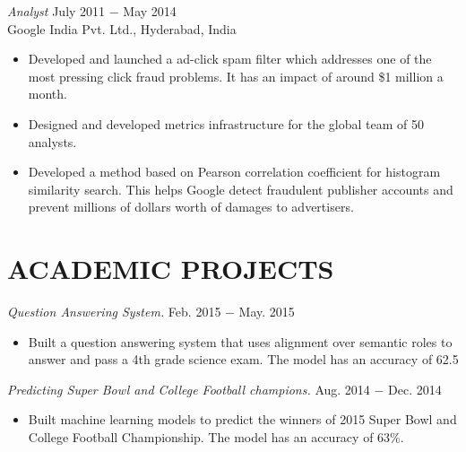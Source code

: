 \documentclass[margin, 2pt]{res} %
\begin{document}
\begin{resume}
{\sl Analyst} \hfill July 2011 $-$ May 2014 \\
Google India Pvt. Ltd., Hyderabad, India 

\begin{itemize} \itemsep -2pt %
  \item Developed and launched a ad-click spam filter which addresses one of the most pressing click fraud problems.
  		It  has an impact of around \$1 million a month.
  \item Designed and developed metrics infrastructure for the global team of 50 analysts.
  \item Developed a method based on Pearson correlation coefficient for histogram similarity search.
  		This helps Google detect fraudulent publisher accounts and prevent millions of dollars worth of damages
        to advertisers.
\end{itemize}


\section{ACADEMIC PROJECTS}

{\sl Question Answering System.} \hfill Feb. 2015 $-$ May. 2015

\begin{itemize} \itemsep -2pt %
  \item Built a question answering system that uses alignment over semantic roles to answer and pass a 4th grade science exam. The model has an accuracy of 62.5%
\end{itemize}

{\sl Predicting Super Bowl and College Football champions.} \hfill Aug. 2014 $-$ Dec. 2014

\begin{itemize} \itemsep -2pt %
  \item Built machine learning models to predict the winners of 2015 Super Bowl and College Football Championship. The model has an accuracy of 63\%.
\end{itemize}


\end{resume}
\end{document}
